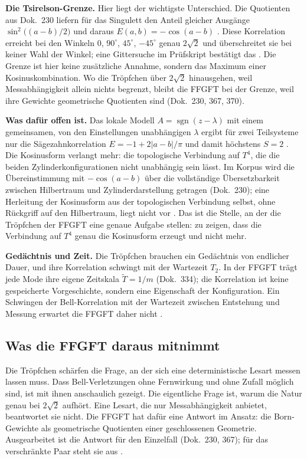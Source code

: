 \textbf{Die Tsirelson-Grenze.} Hier liegt der wichtigste Unterschied. Die Quotienten aus Dok.~230
liefern für das Singulett den Anteil gleicher Ausgänge $\sin^2\!\big((a-b)/2\big)$ und daraus
$E(a,b)=-\cos(a-b)$ \KM. Diese Korrelation erreicht bei den Winkeln $0$, $90^\circ$, $45^\circ$,
$-45^\circ$ genau $2\sqrt2$ und überschreitet sie bei keiner Wahl der Winkel; eine Gittersuche im
Prüfskript bestätigt das \KM. Die Grenze ist hier keine zusätzliche Annahme, sondern das Maximum
einer Kosinuskombination. Wo die Tröpfchen über $2\sqrt2$ hinausgehen, weil Messabhängigkeit allein
nichts begrenzt, bleibt die FFGFT bei der Grenze, weil ihre Gewichte geometrische Quotienten sind
(Dok.~230, 367, 370).

\textbf{Was dafür offen ist.} Das lokale Modell $A=\operatorname{sgn}(z-\lambda)$ mit einem
gemeinsamen, von den Einstellungen unabhängigen $\lambda$ ergibt für zwei Teilsysteme nur die
Sägezahnkorrelation $E=-1+2|a-b|/\pi$ und damit höchstens $S=2$ \KM. Die Kosinusform verlangt mehr:
die topologische Verbindung auf $T^4$, die die beiden Zylinderkonfigurationen nicht unabhängig sein
lässt. Im Korpus wird die Übereinstimmung mit $-\cos(a-b)$ über die vollständige Übersetzbarkeit
zwischen Hilbertraum und Zylinderdarstellung getragen (Dok.~230); eine Herleitung der Kosinusform
aus der topologischen Verbindung selbst, ohne Rückgriff auf den Hilbertraum, liegt nicht vor \SM.
Das ist die Stelle, an der die Tröpfchen der FFGFT eine genaue Aufgabe stellen: zu zeigen, dass die
Verbindung auf $T^4$ genau die Kosinusform erzeugt und nicht mehr.

\textbf{Gedächtnis und Zeit.} Die Tröpfchen brauchen ein Gedächtnis von endlicher Dauer, und ihre
Korrelation schwingt mit der Wartezeit $T_2$. In der FFGFT trägt jede Mode ihre eigene Zeitskala
$\tilde T=1/m$ (Dok.~334); die Korrelation ist keine gespeicherte Vorgeschichte, sondern eine
Eigenschaft der Konfiguration. Ein Schwingen der Bell-Korrelation mit der Wartezeit zwischen
Entstehung und Messung erwartet die FFGFT daher nicht \SM.

\subsection{Was die FFGFT daraus mitnimmt}

Die Tröpfchen schärfen die Frage, an der sich eine deterministische Lesart messen lassen muss. Dass
Bell-Verletzungen ohne Fernwirkung und ohne Zufall möglich sind, ist mit ihnen anschaulich gezeigt.
Die eigentliche Frage ist, warum die Natur genau bei $2\sqrt2$ aufhört. Eine Lesart, die nur
Messabhängigkeit anbietet, beantwortet sie nicht. Die FFGFT hat dafür eine Antwort im Ansatz: die
Born-Gewichte als geometrische Quotienten einer geschlossenen Geometrie. Ausgearbeitet ist die
Antwort für den Einzelfall (Dok.~230, 367); für das verschränkte Paar steht sie aus \SM.

